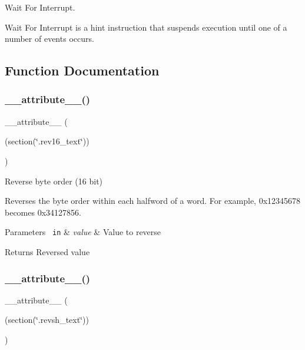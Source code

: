 Wait For Interrupt. 

Wait For Interrupt is a hint instruction that suspends execution until one of a number of events occurs. 

\subsection{Function Documentation}
\mbox{\label{group___c_m_s_i_s___core___instruction_interface_gae84a2733711339c5eefeb0d899506b96}} 
\subsubsection{\texorpdfstring{\_\_attribute\_\_()}{\_\_attribute\_\_()}\hspace{0.1cm}{\footnotesize\ttfamily [1/3]}}
{\footnotesize\ttfamily \+\_\+\+\_\+attribute\+\_\+\+\_\+ (\begin{DoxyParamCaption}\item[{(section(\char`\"{}.rev16\+\_\+text\char`\"{}))}]{ }\end{DoxyParamCaption})}



Reverse byte order (16 bit) 

Reverses the byte order within each halfword of a word. For example, 0x12345678 becomes 0x34127856. 
\begin{DoxyParams}[1]{Parameters}
\mbox{\texttt{ in}}  & {\em value} & Value to reverse \\
\hline
\end{DoxyParams}
\begin{DoxyReturn}{Returns}
Reversed value 
\end{DoxyReturn}
\mbox{\label{group___c_m_s_i_s___core___instruction_interface_gabe2b619a40cc0a7ffa8f765249ccf682}} 
\subsubsection{\texorpdfstring{\_\_attribute\_\_()}{\_\_attribute\_\_()}\hspace{0.1cm}{\footnotesize\ttfamily [2/3]}}
{\footnotesize\ttfamily \+\_\+\+\_\+attribute\+\_\+\+\_\+ (\begin{DoxyParamCaption}\item[{(section(\char`\"{}.revsh\+\_\+text\char`\"{}))}]{ }\end{DoxyParamCaption})}



